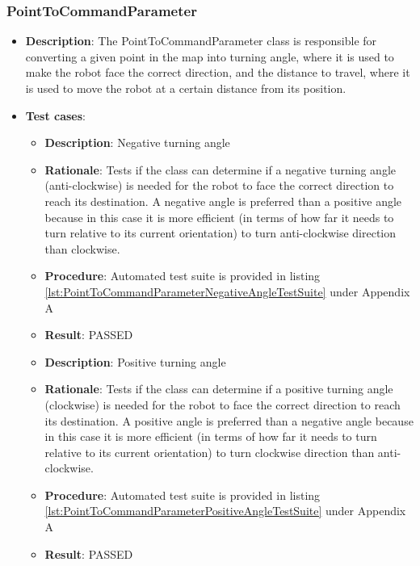 \documentclass[12pt,a4paper]{article}
\begin{document}
	\subsubsection{PointToCommandParameter}
	\begin{itemize}
	\item \textbf{Description}:	The PointToCommandParameter class is responsible for converting a given point in the map into turning angle, where it is used to make the robot face the correct direction, and the distance to travel, where it is used to move the robot at a certain distance from its position.
	\item \textbf{Test cases}:
	\begin{itemize}
		\item \textbf{Description}:	Negative turning angle
		\item \textbf{Rationale}:	Tests if the class can determine if a negative turning angle (anti-clockwise) is needed for the robot to face the correct direction to reach its destination. A negative angle is preferred than a positive angle because in this case it is more efficient (in terms of how far it needs to turn relative to its current orientation) to turn anti-clockwise direction than clockwise.
		\item \textbf{Procedure}:	Automated test suite is provided in listing \ref{lst:PointToCommandParameterNegativeAngleTestSuite} under Appendix A
		\item \textbf{Result}:		PASSED
	\end{itemize}
	\begin{itemize}
		\item \textbf{Description}:	Positive turning angle
		\item \textbf{Rationale}:	Tests if the class can determine if a positive turning angle (clockwise) is needed for the robot to face the correct direction to reach its destination. A positive angle is preferred than a negative angle because in this case it is more efficient (in terms of how far it needs to turn relative to its current orientation) to turn clockwise direction than anti-clockwise.
		\item \textbf{Procedure}:	Automated test suite is provided in listing \ref{lst:PointToCommandParameterPositiveAngleTestSuite} under Appendix A
		\item \textbf{Result}:		PASSED
	\end{itemize}
	\end{itemize}
	
\end{document}
